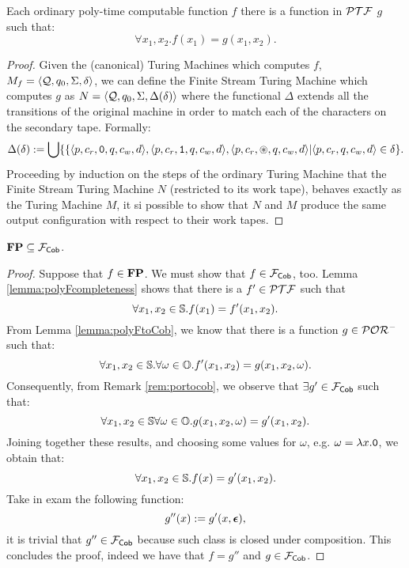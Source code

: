 \begin{lemma}
  \label{lemma:polyFcompleteness}
  Each ordinary poly-time computable function $f$ there is
  a function in $\mathcal{PTF}$ $g$ such that:
  $$
  \forall x_1, x_2. f(x_1) = g(x_1, x_2).
  $$
\end{lemma}
\begin{proof}
  Given the (canonical) Turing Machines which computes $f$,
  $M_f=\langle  \textcolor{black}{\mathcal{Q}}, \textcolor{black}{q_0}, \textcolor{black}{\Sigma}, \textcolor{black}{\delta}\rangle$, we can define
  the Finite Stream Turing Machine which computes $g$ as
  $N=\langle \textcolor{black}{\mathcal{Q}}, \textcolor{black}{q_0}, \textcolor{black}{\Sigma}, \textcolor{black}{\Delta(\delta)}\rangle$ where
  the functional $\Delta$ extends all the transitions of the original machine
  in order to match each of the characters on the secondary tape. Formally:
%
  $$
  \Delta(\delta) := \bigcup \{\{\langle p, c_r, \mathtt{0}, q, c_w, d \rangle,
                                      \langle p, c_r, \mathtt{1}, q, c_w, d \rangle,
                                      \langle p, c_r, \circledast, q, c_w, d \rangle| \langle p, c_r, q, c_w, d \rangle \in \delta \}.
  $$
  \noindent
  Proceeding by induction on the steps of the ordinary Turing Machine that
  the Finite Stream Turing Machine $N$ (restricted to its work tape), behaves
  exactly as the Turing Machine $M$, it si possible to show that $N$ and $M$
  produce the same output configuration with respect to their work tapes.
\end{proof}

\begin{cor}
  $\mathbf{FP} \subseteq \mathcal{F}_{\mathsf{Cob}}$.
\end{cor}
\begin{proof}
  Suppose that $f \in\mathbf{FP}$. We must show that $f \in \mathcal{F}_{\mathsf{Cob}}$, too.
  Lemma \ref{lemma:polyFcompleteness} shows that there is a $f' \in \mathcal{PTF}$ such that
  $$
  \forall x_1, x_2 \in \mathbb{S}. f(x_1)=f'(x_1, x_2).
  $$
  From Lemma \ref{lemma:polyFtoCob}, we know that there is a function
  $g \in \mathcal{POR}^-$ such that:
  $$
  \forall x_1, x_2 \in \mathbb{S}. \forall \omega \in \mathbb{O}. f'(x_1, x_2)=g(x_1, x_2, \omega).
  $$
  Consequently, from Remark \ref{rem:portocob}, we observe that $\exists g' \in \mathcal{F}_{\mathsf{Cob}}$
  such that:
  $$
  \forall x_1, x_2\in \mathbb{S} \forall \omega \in \mathbb{O}. g(x_1,  x_2, \omega)=g'(x_1, x_2).
  $$
  Joining together these results, and choosing some values for $\omega$, e.g. $\omega = \lambda x.\mathtt{0}$, we obtain that:
  $$
  \forall x_1, x_2 \in \mathbb{S}. f(x)=g'(x_1, x_2).
  $$
  Take in exam the following function:
  $$
  g''(x):=g'(x, \bm{\epsilon}),
  $$
  it is trivial that $g''\in \mathcal{F}_{\mathsf{Cob}}$ because such class is closed under composition. This concludes the proof, indeed we have that $f=g''$ and $g \in \mathcal{F}_{\mathsf{Cob}}$.
\end{proof}


